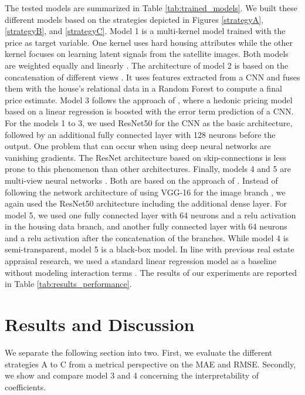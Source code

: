 \documentclass[letterpaper]{article} %
\begin{document}
The tested models are summarized in Table \ref{tab:trained_models}. We built these different models based on the strategies depicted in Figures \ref{strategyA}, \ref{strategyB}, and \ref{strategyC}. Model 1 is a multi-kernel model trained with the price as target variable. One kernel uses hard housing attributes while the other kernel focuses on learning latent signals from the satellite images. Both models are weighted equally and linearly \cite{xu2013survey}. The architecture of model 2 is based on the concatenation of different views \cite{poursaeed2018vision, bency2017beyond, bessinger2016quantifying}. It uses features extracted from a CNN and fuses them with the house's relational data in a Random Forest to compute a final price estimate. Model 3 follows the approach of \citeauthor{naumzik2020one} \citeyearpar{naumzik2020one}, where a hedonic pricing model based on a linear regression is boosted with the error term prediction of a CNN. For the models 1 to 3, we used ResNet50 \cite{he2015delving} for the CNN as the basic architecture, followed by an additional fully connected layer with 128 neurons before the output. One problem that can occur when using deep neural networks are vanishing gradients. The ResNet architecture based on skip-connections is less prone to this phenomenon than other architectures. Finally, models 4 and 5 are multi-view neural networks \cite{li2018survey}. Both are based on the approach of \citeauthor{law2019take} \citeyearpar{law2019take}. Instead of following the network architecture of \citeauthor{law2019take}  \citeyearpar{law2019take} using VGG-16 for the image branch \cite{simonyan2014very},  we again used the ResNet50 architecture including the additional dense layer. For model 5, we used one fully connected layer with 64 neurons and a relu activation in the housing data branch, and another fully connected layer with 64 neurons and a relu activation after the concatenation of the branches. While model 4 is semi-transparent, model 5 is a black-box model. In line with previous real estate appraisal research, we used a standard linear regression model as a baseline without modeling interaction terms  \cite{limsombunchai2004house}. The results of our experiments are reported in Table \ref{tab:results_performance}.

\section{Results and Discussion}
We separate the following section into two. First, we evaluate the different strategies A to C from a metrical perspective on the MAE and RMSE. Secondly, we show and compare model 3 and 4 concerning the interpretability of coefficients.
\end{document}
